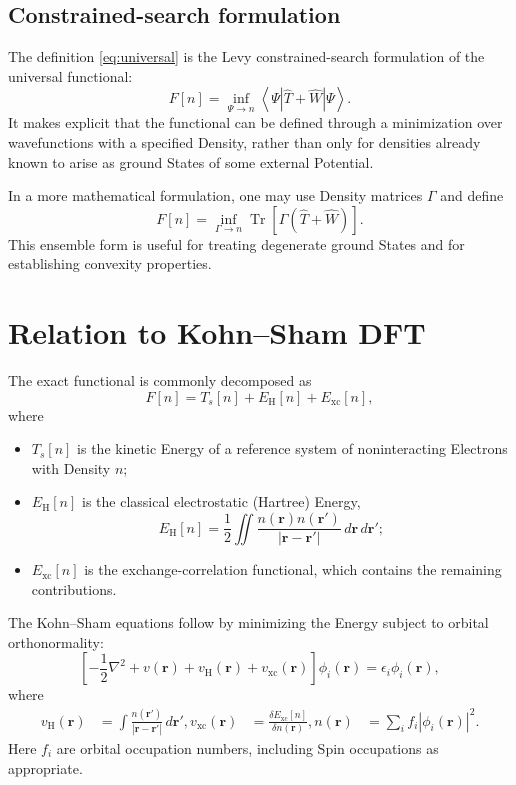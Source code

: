 \documentclass[a4paper, 10pt, onepage]{elegantbook}
\begin{document}
{\subsection{Constrained-search formulation}

The definition \eqref{eq:universal} is the Levy constrained-search
formulation of the universal functional:
\begin{equation}
F[n]
=
\inf_{\Psi\to n}
\left\langle\Psi\left|\hat T+\hat W\right|\Psi\right\rangle.
\end{equation}
It makes explicit that the functional can be defined through a
minimization over wavefunctions with a specified Density, rather
than only for densities already known to arise as ground States of
some external Potential.

In a more mathematical formulation, one may use Density matrices
\(\Gamma\) and define
\begin{equation}
F[n]
=
\inf_{\Gamma\to n}
\operatorname{Tr}\!\left[\Gamma(\hat T+\hat W)\right].
\label{eq:ensemble-functional}
\end{equation}
This ensemble form is useful for treating degenerate ground States
and for establishing convexity properties.

\section{Relation to Kohn--Sham DFT}

The exact functional is commonly decomposed as
\begin{equation}
F[n]=T_s[n]+E_{\mathrm H}[n]+E_{\mathrm{xc}}[n],
\label{eq:KS-decomPosition}
\end{equation}
where
\begin{itemize}
  \item \(T_s[n]\) is the kinetic Energy of a reference system of
  noninteracting Electrons with Density \(n\);
  \item \(E_{\mathrm H}[n]\) is the classical electrostatic
  (Hartree) Energy,
  \begin{equation}
  E_{\mathrm H}[n]
  =
  \frac12\iint
  \frac{n(\mathbf r)n(\mathbf r')}
  {|\mathbf r-\mathbf r'|}
  \,d\mathbf r\,d\mathbf r';
  \end{equation}
  \item \(E_{\mathrm{xc}}[n]\) is the exchange-correlation functional,
  which contains the remaining contributions.
\end{itemize}
The Kohn--Sham equations follow by minimizing the Energy subject to
orbital orthonormality:
\begin{equation}
\left[
-\frac12\nabla^2+v(\mathbf r)+v_{\mathrm H}(\mathbf r)
+v_{\mathrm{xc}}(\mathbf r)
\right]\phi_i(\mathbf r)
=\epsilon_i\phi_i(\mathbf r),
\label{eq:KS}
\end{equation}
where
\begin{align}
v_{\mathrm H}(\mathbf r)
&=\int\frac{n(\mathbf r')}{|\mathbf r-\mathbf r'|}
\,d\mathbf r',
v_{\mathrm{xc}}(\mathbf r)
&=\frac{\delta E_{\mathrm{xc}}[n]}{\delta n(\mathbf r)},
n(\mathbf r)&=\sum_i f_i|\phi_i(\mathbf r)|^2.
\end{align}
Here \(f_i\) are orbital occupation numbers, including Spin
occupations as appropriate.

}
\end{document}
